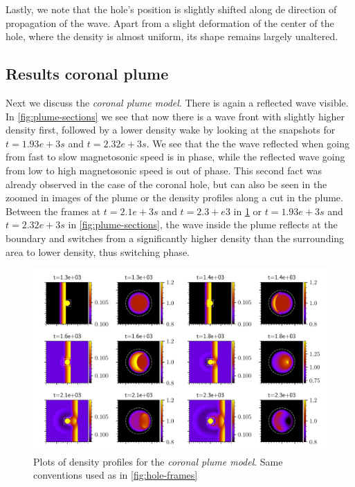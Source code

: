 Lastly, we note that the hole's position is slightly shifted along de direction of propagation of the wave.
Apart from a slight deformation of the center of the hole, where the density is almost uniform, its shape remains largely unaltered.


\subsection{Results coronal plume}
Next we discuss the \emph{coronal plume model}. There is again a reflected wave visible.
In \cref{fig:plume-sections} we see that now there is a wave front with slightly higher density first, followed by a lower density wake by looking at the snapshots for $t=1.93e+3 s$ and $t=2.32e+3 s$.
We see that the the wave reflected when going from fast to slow magnetosonic speed is in phase, while the reflected wave going from low to high magnetosonic speed is out of phase.
This second fact was already observed in the case of the coronal hole, but can also be seen in the zoomed in images of the plume or the density profiles along a cut in the plume.
Between the frames at $t=2.1e+3 s$ and $t=2.3+e3$ in \cref{fig:plume-frames}  or $t=1.93e+3 s$ and $t=2.32e+3 s$ in \cref{fig:plume-sections}, the wave inside the plume reflects at the boundary and switches from a significantly higher density than the surrounding area to lower density, thus switching phase.

\begin{figure}[H]
	\centering
	\includegraphics[width=\linewidth]{images/plume-frames.pdf}
	\caption{Plots of density profiles for the \emph{coronal plume model}. Same conventions used as in \cref{fig:hole-frames}}
	\label{fig:plume-frames}
\end{figure}

